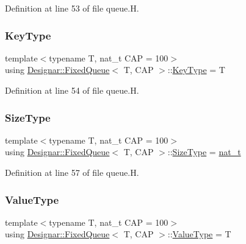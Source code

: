 Definition at line 53 of file queue.\+H.

\mbox{\label{class_designar_1_1_fixed_queue_a37999fa3f2fa0aacaf67d94e6da50f3d}} 
\subsubsection{\texorpdfstring{Key\+Type}{KeyType}}
{\footnotesize\ttfamily template$<$typename T, nat\+\_\+t C\+AP = 100$>$ \\
using \hyperlink{class_designar_1_1_fixed_queue}{Designar\+::\+Fixed\+Queue}$<$ T, C\+AP $>$\+::\hyperlink{class_designar_1_1_fixed_queue_a37999fa3f2fa0aacaf67d94e6da50f3d}{Key\+Type} =  T}



Definition at line 54 of file queue.\+H.

\mbox{\label{class_designar_1_1_fixed_queue_a900c2a6d70517602bd8bc9dc7894c104}} 
\subsubsection{\texorpdfstring{Size\+Type}{SizeType}}
{\footnotesize\ttfamily template$<$typename T, nat\+\_\+t C\+AP = 100$>$ \\
using \hyperlink{class_designar_1_1_fixed_queue}{Designar\+::\+Fixed\+Queue}$<$ T, C\+AP $>$\+::\hyperlink{class_designar_1_1_fixed_queue_a900c2a6d70517602bd8bc9dc7894c104}{Size\+Type} =  \hyperlink{namespace_designar_aa72662848b9f4815e7bf31a7cf3e33d1}{nat\+\_\+t}}



Definition at line 57 of file queue.\+H.

\mbox{\label{class_designar_1_1_fixed_queue_a3507ad9a592d5ade2c7cfe0b9484a4b0}} 
\subsubsection{\texorpdfstring{Value\+Type}{ValueType}}
{\footnotesize\ttfamily template$<$typename T, nat\+\_\+t C\+AP = 100$>$ \\
using \hyperlink{class_designar_1_1_fixed_queue}{Designar\+::\+Fixed\+Queue}$<$ T, C\+AP $>$\+::\hyperlink{class_designar_1_1_fixed_queue_a3507ad9a592d5ade2c7cfe0b9484a4b0}{Value\+Type} =  T}




